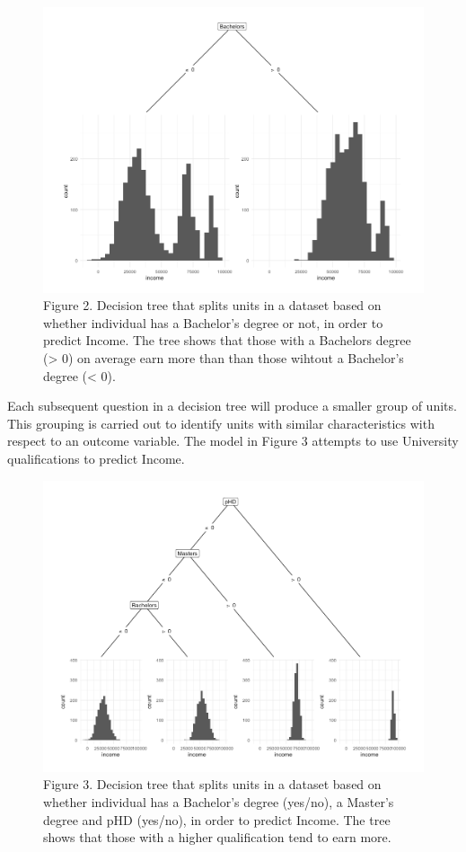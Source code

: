 \documentclass[]{book}
\begin{document}
\begin{figure}
\centering
\includegraphics{images/dt_bach.png}
\caption{Figure 2. Decision tree that splits units in a dataset based on
whether individual has a Bachelor's degree or not, in order to predict
Income. The tree shows that those with a Bachelors degree
(\textgreater{} 0) on average earn more than than those wihtout a
Bachelor's degree (\textless{} 0).}
\end{figure}

Each subsequent question in a decision tree will produce a smaller group
of units. This grouping is carried out to identify units with similar
characteristics with respect to an outcome variable. The model in Figure
3 attempts to use University qualifications to predict Income.

\begin{figure}
\centering
\includegraphics{images/dt_all.png}
\caption{Figure 3. Decision tree that splits units in a dataset based on
whether individual has a Bachelor's degree (yes/no), a Master's degree
and pHD (yes/no), in order to predict Income. The tree shows that those
with a higher qualification tend to earn more.}
\end{figure}
\end{document}
